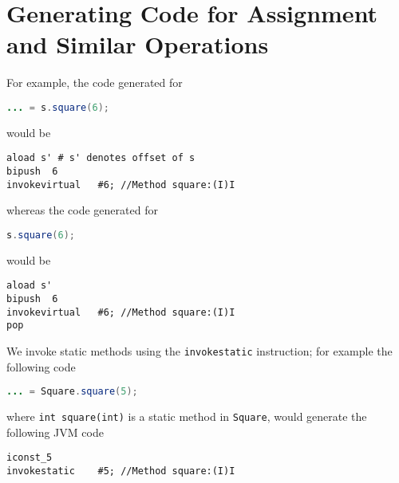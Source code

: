 \documentclass[8pt,a4paper,compress]{beamer}
\begin{document}
\section{Generating Code for Assignment and Similar Operations}
\begin{frame}[fragile]
\pause

For example, the code generated for 
\begin{lstlisting}[language=Java]
... = s.square(6);
\end{lstlisting}
would be
\begin{lstlisting}[language={}]
aload s' # s' denotes offset of s
bipush  6
invokevirtual   #6; //Method square:(I)I
\end{lstlisting}

whereas the code generated for 
\begin{lstlisting}[language=Java]
s.square(6);
\end{lstlisting}
would be 
\begin{lstlisting}[language={}]
aload s'
bipush  6
invokevirtual   #6; //Method square:(I)I
pop
\end{lstlisting}

\pause
\bigskip

We invoke static methods using the \lstinline{invokestatic} instruction; for example the following \jmm code
\begin{lstlisting}[language=Java]
... = Square.square(5);
\end{lstlisting}
where \lstinline{int square(int)} is a static method in \lstinline{Square}, would generate the following JVM code
\begin{lstlisting}[language={}]
iconst_5
invokestatic    #5; //Method square:(I)I
\end{lstlisting}
\end{frame}
\end{document}
